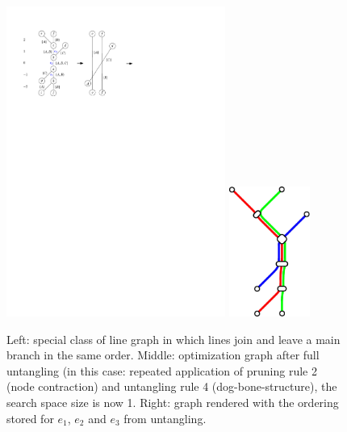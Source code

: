 \documentclass[format=acmsmall, review=false, screen=true]{acmart}
\begin{document}
\begin{figure}
  \centering
  \includegraphics[width=0.64\textwidth,page=1]{figures/untangling/main_leg.pdf}
  \includegraphics[width=0.235\textwidth,page=1]{figures/untangling/bone.pdf}

  \caption{Left: special class of line graph in which lines join and leave a main branch in the same order. Middle: optimization graph after full untangling (in this case: repeated application of pruning rule 2 (node contraction) and untangling rule 4 (dog-bone-structure), the search space size is now 1. Right: graph rendered with the ordering stored for $e_1$, $e_2$ and $e_3$ from untangling.}
  \label{FIG:untangle_main_branch}
\end{figure}

%
\end{document}
